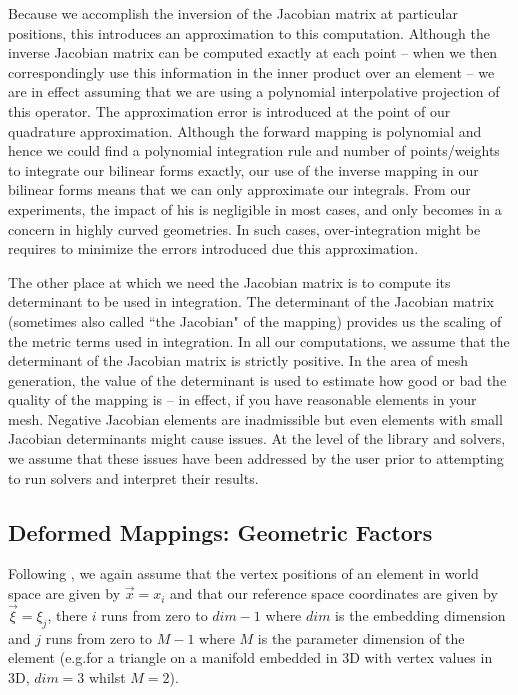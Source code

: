 Because we accomplish the inversion of the Jacobian matrix at particular positions, this introduces an approximation to this computation.
Although the inverse Jacobian matrix can be computed exactly at each point -- when we then correspondingly use this information 
in the inner product over an element -- we are in effect assuming that we are using a polynomial interpolative projection of this operator.
The approximation error is introduced at the point of our quadrature approximation.  Although the forward mapping is polynomial and hence
we could find a polynomial integration rule and number of points/weights to integrate our bilinear forms exactly, our use of the inverse
mapping in our bilinear forms means that we can only approximate our integrals.  From our experiments, the impact of his is negligible
in most cases, and only becomes in a concern in highly curved geometries.  In such cases, over-integration might be requires to minimize
the errors introduced due this approximation.

The other place at which we need the Jacobian matrix is to compute its determinant to be used in integration.  The determinant of the Jacobian
matrix (sometimes also called ``the Jacobian" of the mapping) provides us the scaling of the metric terms used in integration.  In all our
computations, we assume that the determinant of the Jacobian matrix is strictly positive.   In the area of mesh generation, the value 
of the determinant is used to estimate how good or bad the quality of the mapping is -- in effect, if you have reasonable elements in your mesh.
Negative Jacobian elements are inadmissible but even elements with small Jacobian determinants might cause issues.   At
the level of the library and solvers, we assume that these issues have been addressed by the user prior to attempting to run {\nek}
solvers and interpret their results.


\subsection{Deformed Mappings: Geometric Factors}

Following \cite{CantwellYKPS14}, we again assume that the vertex positions of an element in world space are given by $\vec{x} = x_i$ and that our reference space
coordinates are given by $\vec{\xi} = \xi_j$, there $i$ runs from zero to $dim-1$ where $dim$ is the embedding dimension and $j$ runs from zero to $M-1$ where $M$
is the parameter dimension of the element (e.g.for a triangle on a manifold embedded in 3D with vertex values in 3D, $dim = 3$ whilst $M=2$).

